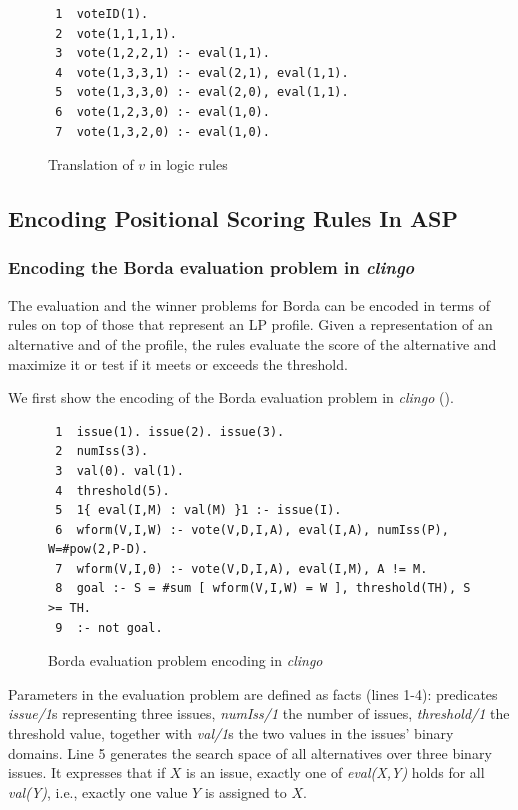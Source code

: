 \begin{figure}[H]
   \small
	\begin{framed}
		\begin{verbatim}
 1  voteID(1).
 2  vote(1,1,1,1).
 3  vote(1,2,2,1) :- eval(1,1).
 4  vote(1,3,3,1) :- eval(2,1), eval(1,1).
 5  vote(1,3,3,0) :- eval(2,0), eval(1,1).
 6  vote(1,2,3,0) :- eval(1,0).
 7  vote(1,3,2,0) :- eval(1,0).
		\end{verbatim}
	\end{framed}
	\caption{Translation of $v$ in logic rules}
  \label{fig:LPTreeASP}
\end{figure}
  


\subsection{Encoding Positional Scoring Rules In ASP}

\subsubsection{Encoding the Borda evaluation problem in \emph{clingo}}

The evaluation and the winner problems for Borda can 
be encoded in terms of rules on top of those that represent an LP profile.
Given a representation of an alternative and of the profile, the rules
evaluate the score of the alternative and maximize it or test if 
it meets or exceeds the threshold. 

We first show the encoding of the Borda evaluation problem in \emph{clingo}
().
\begin{figure}[ht]
  \centering
	\begin{framed}
	\small
		\begin{verbatim}
 1  issue(1). issue(2). issue(3).
 2  numIss(3).
 3  val(0). val(1).
 4  threshold(5).
 5  1{ eval(I,M) : val(M) }1 :- issue(I).
 6  wform(V,I,W) :- vote(V,D,I,A), eval(I,A), numIss(P), W=#pow(2,P-D).
 7  wform(V,I,0) :- vote(V,D,I,A), eval(I,M), A != M.
 8  goal :- S = #sum [ wform(V,I,W) = W ], threshold(TH), S >= TH.
 9  :- not goal.
		\end{verbatim}
	\end{framed}
	\caption{Borda evaluation problem encoding in \emph{clingo}}
	\label{fig:clingo:bordaEval}
\end{figure}
Parameters in the evaluation problem are defined as facts (lines 1-4):
predicates \textit{issue/1}s representing three issues, 
\textit{numIss/1} the number of issues, \textit{threshold/1} the threshold value, 
together with \textit{val/1}s the two values in the issues' binary domains.
Line 5 generates the search space of all alternatives over three
binary issues.
It expresses that if $X$ is an issue, exactly one of 
\textit{eval(X,Y)} holds for all \textit{val(Y)},
i.e., exactly one value $Y$ is assigned to $X$.

